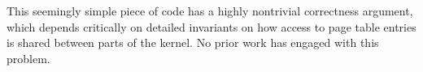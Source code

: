 This seemingly simple piece of code has a highly nontrivial correctness argument, which depends critically on detailed invariants on how access to page table
entries is shared between parts of the kernel. No prior work has engaged with this problem.

